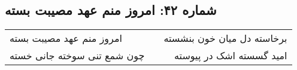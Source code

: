 \begin{center}
\section*{شماره ۴۲: امروز منم عهد مصیبت بسته}
\label{sec:042}
\begin{longtable}{l p{0.5cm} r}
امروز منم عهد مصیبت بسته
&&
برخاسته دل میان خون بنشسته
\\
چون شمع تنی سوخته جانی خسته
&&
امید گسسته اشک در پیوسته
\\
\end{longtable}
\end{center}
